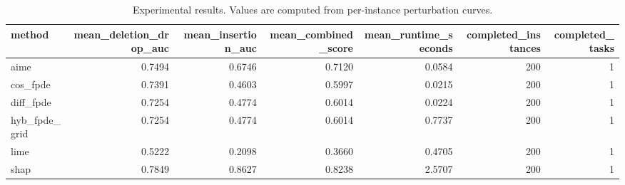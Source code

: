 \begin{table}[t]
\caption{Experimental results. Values are computed from per-instance perturbation curves.}
\label{tab:main_results_computed}
\centering
\begin{tabular}{lrrrrrr}
\toprule
method & mean\_deletion\_drop\_auc & mean\_insertion\_auc & mean\_combined\_score & mean\_runtime\_seconds & completed\_instances & completed\_tasks \\
\midrule
aime & 0.7494 & 0.6746 & 0.7120 & 0.0584 & 200 & 1 \\
cos\_fpde & 0.7391 & 0.4603 & 0.5997 & 0.0215 & 200 & 1 \\
diff\_fpde & 0.7254 & 0.4774 & 0.6014 & 0.0224 & 200 & 1 \\
hyb\_fpde\_grid & 0.7254 & 0.4774 & 0.6014 & 0.7737 & 200 & 1 \\
lime & 0.5222 & 0.2098 & 0.3660 & 0.4705 & 200 & 1 \\
shap & 0.7849 & 0.8627 & 0.8238 & 2.5707 & 200 & 1 \\
\bottomrule
\end{tabular}

\end{table}
